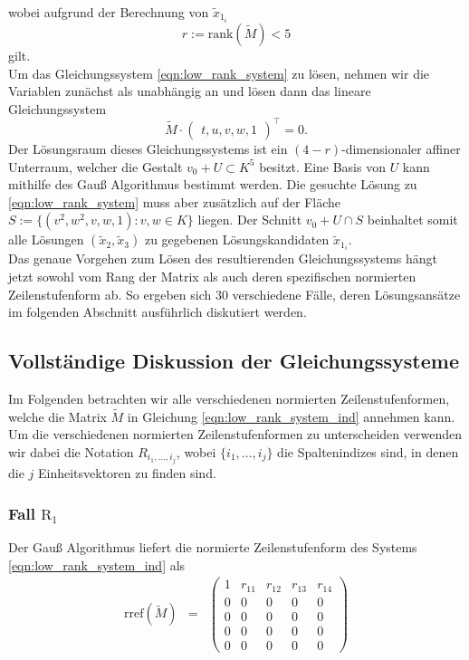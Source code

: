 \documentclass[a4paper,oneside, 11pt, openany%
]{article}
\newcommand{\coloneqq}{:=}
\theoremstyle{custom}
\theoremstyle{custom}
\begin{document}
wobei aufgrund der Berechnung von $\tilde{x}_{1_{i}}$ 
\begin{equation*}
	r \coloneqq \text{rank}(\tilde{M}) < 5
\end{equation*} gilt.\\
Um das Gleichungssystem \eqref{eqn:low_rank_system} zu lösen, nehmen wir die Variablen zunächst als unabhängig an und lösen dann das lineare Gleichungssystem
\begin{equation}\label{eqn:low_rank_system_ind}
	\tilde{M} \cdot\begin{pmatrix}
		t,
		u,
		v,
		w,
		1
	\end{pmatrix}^\top
	=0.
\end{equation}
Der Lösungsraum dieses Gleichungssystems ist ein $(4-r)$-dimensionaler affiner Unterraum, welcher die Gestalt ${v_0 + U \subset K^5}$ besitzt. Eine Basis von $U$ kann mithilfe des Gauß Algorithmus bestimmt werden. Die gesuchte Lösung zu \eqref{eqn:low_rank_system} muss aber zusätzlich auf der Fläche ${S \coloneqq \{(v^2,w^2,v,w,1) : v,w \in K\}}$ liegen. Der Schnitt $v_0 + U \cap S $ beinhaltet somit alle Lösungen $(\tilde{x}_{2},\tilde{x}_{3})$ zu gegebenen Lösungskandidaten $\tilde{x}_{1_{i}}$.\\
Das genaue Vorgehen zum Lösen des resultierenden Gleichungssystems hängt jetzt sowohl vom Rang der Matrix als auch deren spezifischen normierten Zeilenstufenform ab. So ergeben sich $30$ verschiedene Fälle, deren Lösungsansätze im folgenden Abschnitt ausführlich diskutiert werden.
\newpage
\subsection{Vollständige Diskussion der Gleichungssysteme}\label{sec:5C3_GLS}
Im Folgenden betrachten wir alle verschiedenen normierten Zeilenstufenformen, welche die Matrix $\tilde{M}$ in Gleichung \eqref{eqn:low_rank_system_ind} annehmen kann.
Um die verschiedenen normierten Zeilenstufenformen zu unterscheiden verwenden wir dabei die Notation $R_{i_1,\ldots,i_j}$, wobei $\{i_1,\ldots,i_j\}$ die Spaltenindizes sind, in denen die $j$ Einheitsvektoren zu finden sind.
\subsubsection*{Fall $\text{R}_{1}$}
Der Gauß Algorithmus liefert die normierte Zeilenstufenform des Systems \eqref{eqn:low_rank_system_ind} als
\begin{equation*}\label{eqn:rref_r1}
	\begin{alignedat}{-1}
		\text{rref}(\tilde{M}) &=& 
		\left( \begin{array}{ccccc}
			1&r_{11}&r_{12}&r_{13}&r_{14}\\
			0&0&0&0&0\\
			0&0&0&0&0\\
			0&0&0&0&0\\
			0&0&0&0&0
		\end{array}
		\right)
	\end{alignedat}
\end{equation*}
\end{document}
